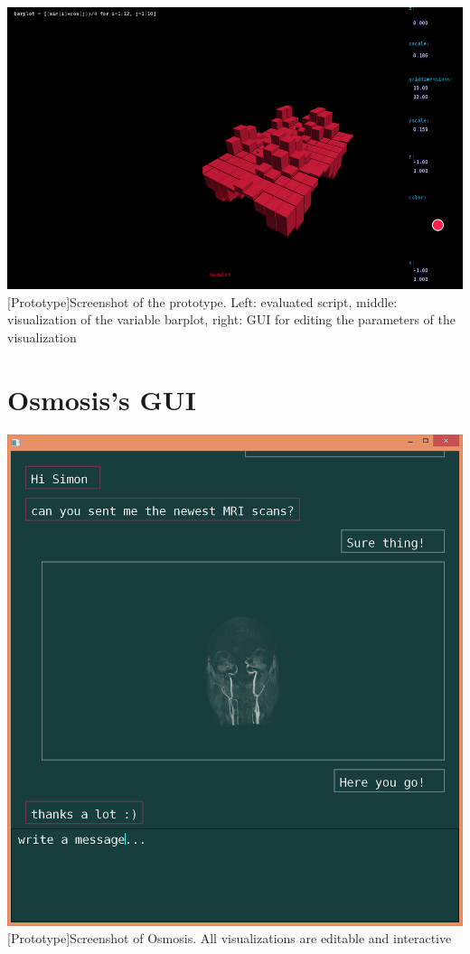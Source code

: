 \begin{appendix}
\begin{minipage}{\linewidth}
    \centering
    \includegraphics[scale=2.0]{graphics/screenshot.png}
    [Prototype]{Screenshot of the prototype. Left: evaluated script, middle: visualization of the variable barplot, right: GUI for editing the parameters of the visualization}
    \label{app:screenshot}
\end{minipage}

\section{Osmosis's GUI}

\begin{minipage}{\linewidth}
    \centering
    \includegraphics[scale=0.2]{graphics/osmosis.png}
    [Prototype]{Screenshot of Osmosis. All visualizations are editable and interactive}
    \label{app:osmosis}
\end{minipage}



\end{appendix}
